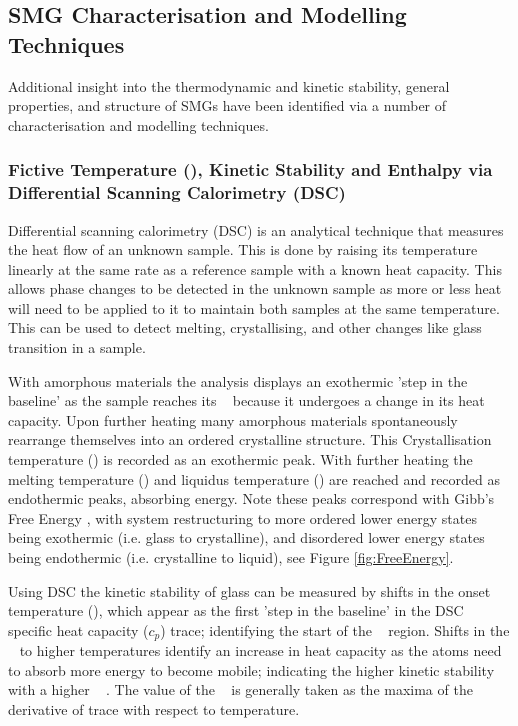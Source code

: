 \documentclass[a4paper,12pt,oneside]{report}%
\begin{document}
\subsection{SMG Characterisation and Modelling Techniques}
Additional insight into the thermodynamic and kinetic stability, general properties, and structure of SMGs have been identified via a number of characterisation and modelling techniques. 

\subsubsection{Fictive Temperature (\Tf), Kinetic Stability and Enthalpy via Differential Scanning Calorimetry (DSC)}
Differential scanning calorimetry (DSC) is an analytical technique that measures the heat flow of an unknown sample. This is done by raising its temperature linearly at the same rate as a reference sample with a known heat capacity. This allows phase changes to be detected in the unknown sample as more or less heat will need to be applied to it to maintain both samples at the same temperature. This can be used to detect melting, crystallising, and other changes like glass transition in a sample.

With amorphous materials the analysis displays an exothermic 'step in the baseline' as the sample reaches its \Tg~ because it undergoes a change in its heat capacity. Upon further heating many amorphous materials spontaneously rearrange themselves into an ordered crystalline structure. This Crystallisation temperature  (\Tx) is recorded as an exothermic peak. With further heating the melting temperature (\Tm) and liquidus temperature (\Tl) are reached and recorded as endothermic  peaks, absorbing energy. Note these peaks correspond with Gibb's Free Energy , with system restructuring to more ordered lower energy states being exothermic (i.e. glass to crystalline), and disordered lower energy states being endothermic (i.e. crystalline to liquid), see Figure \ref{fig:FreeEnergy}.

Using DSC the kinetic stability of glass can be measured by shifts in the onset temperature (\Tonset), which appear as the first 'step in the baseline' in the DSC specific heat capacity ($c_{p}$) trace; identifying the start of the \Tg~ region. Shifts in the \Tonset~ to higher temperatures identify an increase in heat capacity as the atoms need to absorb more energy to become mobile; indicating the higher kinetic stability with a higher \Tg~ \cite{Kearns2008}. The value of the \Tg~ is generally taken as the maxima of the derivative of trace with respect to temperature.
\end{document}
